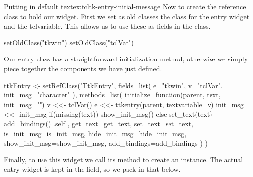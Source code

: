 \begin{example}{Putting in default text}{ex:tcltk-entry-initial-message}
Now to create the reference class to hold our widget. First we set as old
classes the class for the entry widget and the tclvariable. This
allows us to use these as fields in the class.
\begin{Schunk}
\begin{Sinput}
 setOldClass("tkwin")
 setOldClass("tclVar")
\end{Sinput}
\end{Schunk}
%
Our entry class has a straightforward initialization method, otherwise
we simply piece together the components we have just defined.
\begin{Schunk}
\begin{Sinput}
 ttkEntry <- setRefClass("TtkEntry",
                         fields=list(
                           e="tkwin", v="tclVar",
                           init_msg="character"
                           ),
                         methods=list(
                           initialize=function(parent, text, init_msg="") {
                             v <<- tclVar()
                             e <<- ttkentry(parent, textvariable=v)
                             init_msg <<- init_msg
                             if(missing(text))
                               show_init_msg()
                             else
                               set_text(text)
                             add_bindings()
                             .self
                           },
                           get_text=get_text,
                           set_text=set_text,
                           is_init_msg=is_init_msg,
                           hide_init_msg=hide_init_msg,
                           show_init_msg=show_init_msg,
                           add_bindings=add_bindings
                           )
                         )
\end{Sinput}
\end{Schunk}

Finally, to use this widget we call its  method to create an
instance. The actual entry widget is kept in the  field, so we
pack in that below.
\begin{Schunk}
\end{Schunk}

\end{example}


